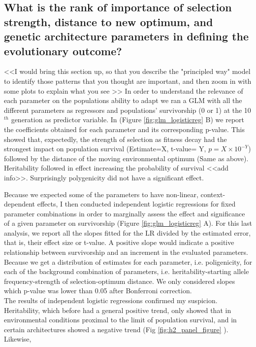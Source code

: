 \documentclass{article}
\begin{document}
\subsection{What is the rank of importance of selection strength, distance to new optimum, and genetic architecture parameters in defining the evolutionary outcome?}
<<I would bring this section up, so that you describe the "principled way" model to identify those patterns that you thought are important, and then zoom in with some plots to explain what you see >>
In order to understand the relevance of each parameter on the populations ability to adapt we ran a GLM with all the different parameters as regressors and populations' survivorship (0 or 1) at the 10$^{th}$ generation as predictor variable. In (Figure \ref{fig:glm_logisticreg} B) we report the coefficients obtained for each parameter and its corresponding p-value. This showed that, expectedly, the strength of selection as fitness decay had the strongest impact on population survival (Estimate=X, t-value= Y,  $p=X \times 10^{-Y}$)  followed by the distance of the moving environmental optimum (Same as above). Heritability followed in effect increasing the probability of survival <<add info>>.  Surprisingly polygenicity did not have a significant effect. 

Because we expected some of the parameters to have non-linear, context-dependent effects, I then conducted independent logistic regressions for fixed parameter combinations in order to marginally assess the effect and significance of a given parameter on survivorship (Figure \ref{fig:glm_logisticreg} A). For this last analysis, we report all the slopes fitted for the LR divided by the estimated error, that is, their effect size or t-value. A positive slope would indicate a positive relationship between survivorship and an increment in the evaluated parameters. Because we get a distribution of estimates for each parameter, i.e. poligenicity, for each of the background combination of parameters, i.e. heritability-starting allele frequency-strength of selection-optimum distance. We only considered slopes which p-value was lower than 0.05 after Bonferroni correction. 
\\
The results of independent logistic regressions confirmed my suspicion. Heritability, which before had a general positive trend, only showed that in environmental conditions proximal to the limit of population survival, and in certain architectures showed a negative trend (Fig \ref{fig:h2_panel_figure} ). Likewise, 
\end{document}
